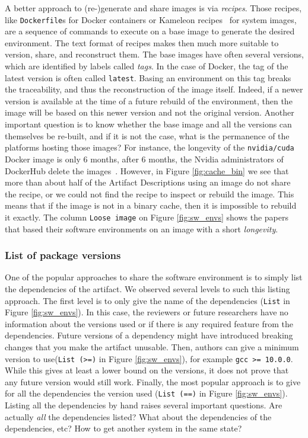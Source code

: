 \documentclass[sigconf,natbib=false]{acmart}
\newcommand{\ad}{Artifact Description}
\begin{document}
A better approach to (re-)generate and share images is via \emph{recipes}.
Those recipes, like \texttt{Dockerfile}s for Docker containers or Kameleon recipes~\cite{ruiz_reconstructable_2015} for system images, are a sequence of commands to execute on a base image to generate the desired environment.
The text format of recipes makes then much more suitable to version, share, and reconstruct them.
The base images have often several versions, which are identified by labels called \emph{tags}.
In the case of Docker, the tag of the latest version is often called \texttt{latest}.
Basing an environment on this tag breaks the traceability, and thus the reconstruction of the image itself.
Indeed, if a newer version is available at the time of a future rebuild of the environment, then the image will be based on this newer version and not the original version.
Another important question is to know whether the base image and all the versions can themselves be re-built, and if it is not the case, what is the permanence of the platforms hosting those images?
For instance, the longevity of the \texttt{nvidia/cuda} Docker image is only 6 months, after 6 months, the Nvidia administrators of DockerHub delete the images\ \cite{nvidia_cuda_lifetime}.
However, in Figure \ref{fig:cache_bin} we see that more than about half of the \ad s using an image do not share the recipe, or we could not find the recipe to inspect or rebuild the image.
This means that if the image is not in a binary cache, then it is impossible to rebuild it exactly.
The column \texttt{Loose image} on Figure \ref{fig:sw_envs} shows the papers that based their software environments on an image with a short \emph{longevity}.


\subsubsection{List of package versions}\label{sec:sop:sw:list}

One of the popular approaches to share the software environment is to simply list the dependencies of the artifact.
We observed several levels to such this listing approach.
The first level is to only give the name of the dependencies (\texttt{List} in Figure \ref{fig:sw_envs}).
In this case, the reviewers or future researchers have no information about the versions used or if there is any required feature from the dependencies.
Future versions of a dependency might have introduced breaking changes that you make the artifact unusable.
Then, authors can give a minimum version to use(\texttt{List (>=)} in Figure \ref{fig:sw_envs}), for example \texttt{gcc >= 10.0.0}.
While this gives at least a lower bound on the versions, it does not prove that any future version would still work.
Finally, the most popular approach is to give for all the dependencies the version used (\texttt{List (==)} in Figure \ref{fig:sw_envs}).
Listing all the dependencies by hand raises several important questions.
Are actually \emph{all} the dependencies listed?
What about the dependencies of the dependencies, etc?
How to get another system in the same state?
\end{document}
